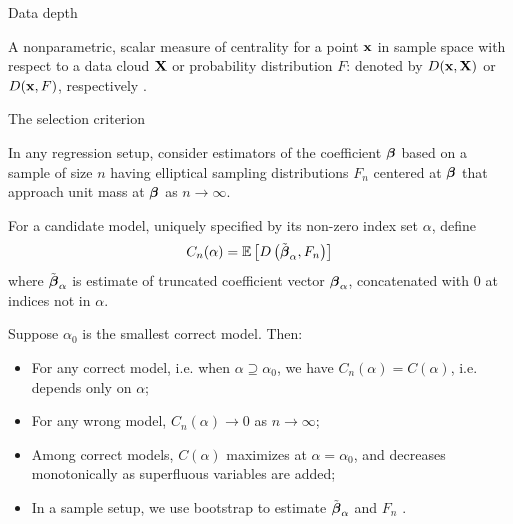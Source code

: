 \documentclass[landscape,a0paper,fontscale=0.3]{baposter} %
\newcommand{\compresslist}{ %
\setlength{\itemsep}{1pt}
\setlength{\parskip}{0pt}
\setlength{\parsep}{0pt}
}
\begin{document}
\begin{poster}
{{\large {\colbbf Data depth}}

A nonparametric, scalar measure of centrality for a point ${\bf{x}}$ in sample space with respect to a data cloud ${\mathbf{X}}$ or probability  distribution $F$: denoted by $D({\bf{x}}, {\mathbf{X}})$ or $D({\bf{x}}, F)$, respectively \citep{ZuoSerfling00c}.

\vspace{1em}
{\large {\colbbf The selection criterion}}

In any regression setup, consider estimators of the coefficient ${\boldsymbol{\beta}}$ based on a sample of size $n$ having elliptical sampling distributions $F_n$ centered at ${\boldsymbol{\beta}}$ that approach unit mass at ${\boldsymbol{\beta}}$ as $n \rightarrow \infty$.

\vspace{.3em}
For a candidate model, uniquely specified by its non-zero index set $\alpha$, define
\vspace{-.5em}
$$ C_n (\alpha) = \mathbb E \left[ D \left( \tilde {{\boldsymbol{\beta}}}_\alpha, F_n \right) \right] $$
where $\tilde {{\boldsymbol{\beta}}}_\alpha$ is estimate of truncated coefficient vector ${\boldsymbol{\beta}}_\alpha$, concatenated with 0 at indices not in $\alpha$.

\vspace{.3em}
Suppose $\alpha_0$ is the smallest correct model. Then:

\vspace{-.5em}
\begin{itemize}[leftmargin=*]\compresslist
\item For any correct model, i.e. when $\alpha \supseteq \alpha_0$, we have $C_n(\alpha) = C(\alpha)$, i.e. depends only on $\alpha$;

\item For any wrong model, $C_n (\alpha) \rightarrow 0$ as $n \rightarrow \infty$;

\item Among correct models, $C(\alpha)$ maximizes at $\alpha=\alpha_0$, and decreases monotonically as superfluous variables are added;

\item In a sample setup, we use bootstrap to estimate $\tilde {{\boldsymbol{\beta}}}_\alpha$ and $F_n$ \citep{MajumdarMS}.
\end{itemize}
}


\end{poster}
\end{document}
